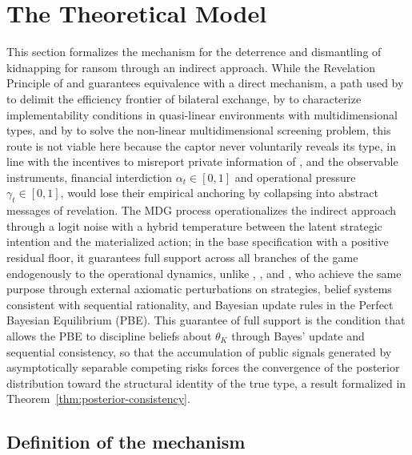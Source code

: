 \documentclass[ecta,nameyear,draft]{econsocart}
\theoremstyle{plain}
\theoremstyle{definition}
\newcommand{\1}{\mathbf{1}}
\begin{document}
\section{The Theoretical Model}\label{sec:model}

This section formalizes the mechanism for the deterrence and dismantling of kidnapping for ransom through an indirect approach. While the Revelation Principle of \citet{Gibbard1973} and \citet{Myerson1979IC,Myerson1981} guarantees equivalence with a direct mechanism, a path used by \citet{MyersonSatterthwaite1983} to delimit the efficiency frontier of bilateral exchange, by \citet{Rochet1987} to characterize implementability conditions in quasi-linear environments with multidimensional types, and by \citet{RochetChone1998} to solve the non-linear multidimensional screening problem, this route is not viable here because the captor never voluntarily reveals its type, in line with the incentives to misreport private information of \citet{Fearon1995Rationalist}, and the observable instruments, financial interdiction $\alpha_t\in[0,1]$ and operational pressure $\gamma_t\in[0,1]$, would lose their empirical anchoring by collapsing into abstract messages of revelation. The MDG process operationalizes the indirect approach through a logit noise with a hybrid temperature between the latent strategic intention and the materialized action; in the base specification with a positive residual floor, it guarantees full support across all branches of the game endogenously to the operational dynamics, unlike \citet{Selten1975Perfectness}, \citet{KrepsWilson1982}, and \citet{FudenbergTirole1991}, who achieve the same purpose through external axiomatic perturbations on strategies, belief systems consistent with sequential rationality, and Bayesian update rules in the Perfect Bayesian Equilibrium (PBE). This guarantee of full support is the condition that allows the PBE to discipline beliefs about $\theta_K$ through Bayes' update and sequential consistency, so that the accumulation of public signals generated by asymptotically separable competing risks forces the convergence of the posterior distribution toward the structural identity of the true type, a result formalized in Theorem~\ref{thm:posterior-consistency}.

\subsection{Definition of the mechanism}\label{subsec:def-mecanismo}
\end{document}
